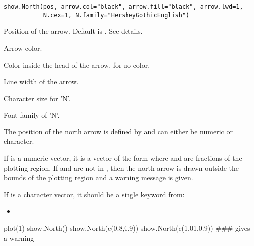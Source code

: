 \documentclass[a4paper]{book}
\begin{document}
%
\begin{Usage}
\begin{verbatim}
show.North(pos, arrow.col="black", arrow.fill="black", arrow.lwd=1,
           N.cex=1, N.family="HersheyGothicEnglish")
\end{verbatim}
\end{Usage}
%
\begin{Arguments}
\begin{ldescription}
\item[\code{pos}] Position of the arrow. Default is . See details.

\item[\code{arrow.col}] Arrow color.

\item[\code{arrow.fill}] Color inside the head of the arrow.  for no color.

\item[\code{arrow.lwd}] Line width of the arrow.

\item[\code{N.cex}] Character size for 'N'.

\item[\code{N.family}] Font family of 'N'.


\end{ldescription}
\end{Arguments}
%
\begin{Details}\relax
The position of the north arrow is defined by  and can either be numeric or character.

If  is a numeric vector, it is a vector of the form  where  and  are fractions of the plotting region. 
If  and  are not in \eqn{[0, 1]}{}, then the north arrow is drawn outside the bounds of the plotting region 
and a warning message is given.\\{}

If  is a character vector, it should be a single keyword from:
\begin{itemize}

\item {}

\end{itemize}
 

\end{Details}
%
\begin{Examples}
\begin{ExampleCode}
plot(1)
show.North()
show.North(c(0.8,0.9))
show.North(c(1.01,0.9))  ### gives a warning
\end{ExampleCode}
\end{Examples}
\end{document}
